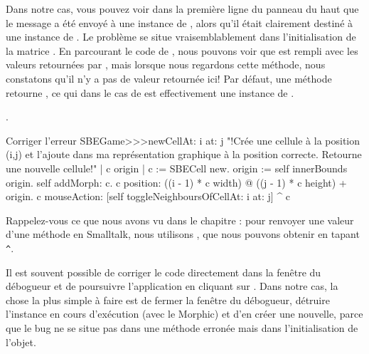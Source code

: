 \documentclass[a4paper,10pt,twoside]{book}
\begin{document}
Dans notre cas, vous pouvez voir dans la première ligne du panneau du haut que le message  a été envoyé à une instance de , alors qu'il était clairement destiné à une instance de .
Le problème se situe vraisemblablement dans l'initialisation de la matrice .
En parcourant le code de , nous pouvons
voir que  est rempli avec les valeurs retournées par
, mais lorsque nous regardons cette méthode, nous
constatons qu'il n'y a pas de valeur retournée ici!
Par défaut, une méthode retourne , ce qui dans le cas de  est effectivement une instance de .

.

\begin{method}{Corriger l'erreur}
SBEGame>>>newCellAt: i at: j
    "!Cr\'ee une cellule \`a la position (i,j) et l'ajoute dans ma
    repr\'esentation graphique \`a la position correcte. Retourne une
    nouvelle cellule!"
   | c origin |
   c := SBECell new.
   origin := self innerBounds origin.
   self addMorph: c.
   c position: ((i - 1) * c width) @ ((j - 1) * c height) + origin.
   c mouseAction: [self toggleNeighboursOfCellAt: i at: j]
   ^ c
\end{method}

\noindent
Rappelez-vous ce que nous avons vu dans le chapitre :
pour renvoyer une valeur d'une méthode en Smalltalk, nous utilisons 
 \ct{^}, que nous pouvons obtenir en tapant \verb|^|.

Il est souvent possible de corriger le code directement dans la
fenêtre du débogueur et de poursuivre l'application en cliquant sur
.
Dans notre cas, la chose la plus simple à faire est de fermer la
fenêtre du débogueur, détruire l'instance en cours d'exécution (avec
le  Morphic) et d'en créer une nouvelle, parce que le bug
ne se situe pas dans une m\'ethode erron\'ee mais dans
l'initialisation de l'objet.
\end{document}
